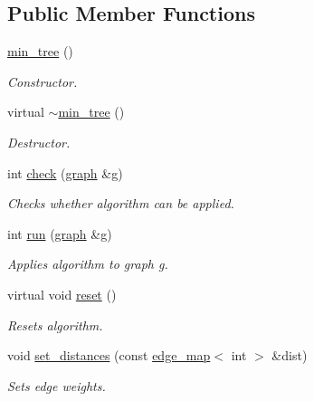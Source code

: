\subsection*{Public Member Functions}
\begin{DoxyCompactItemize}
\item 
\mbox{\label{classmin__tree_a4be3e62d3ba8237883dcc04419ecd483}} 
\mbox{\hyperlink{classmin__tree_a4be3e62d3ba8237883dcc04419ecd483}{min\+\_\+tree}} ()
\begin{DoxyCompactList}\small\item\em Constructor. \end{DoxyCompactList}\item 
\mbox{\label{classmin__tree_a0df992f77a8656121777aa2c0380a67a}} 
virtual \mbox{\hyperlink{classmin__tree_a0df992f77a8656121777aa2c0380a67a}{$\sim$min\+\_\+tree}} ()
\begin{DoxyCompactList}\small\item\em Destructor. \end{DoxyCompactList}\item 
int \mbox{\hyperlink{classmin__tree_ad87b1bfbc687ad943c07538fa0c3d270}{check}} (\mbox{\hyperlink{classgraph}{graph}} \&g)
\begin{DoxyCompactList}\small\item\em Checks whether algorithm can be applied. \end{DoxyCompactList}\item 
int \mbox{\hyperlink{classmin__tree_ac025e8dad0db7a6a1e0e7b476b547802}{run}} (\mbox{\hyperlink{classgraph}{graph}} \&g)
\begin{DoxyCompactList}\small\item\em Applies algorithm to graph g. \end{DoxyCompactList}\item 
virtual void \mbox{\hyperlink{classmin__tree_a0edbe612424dc5f4de4701b8fd0df931}{reset}} ()
\begin{DoxyCompactList}\small\item\em Resets algorithm. \end{DoxyCompactList}\item 
void \mbox{\hyperlink{classmin__tree_a0f3eb1714b7859576037cf4b991b16cb}{set\+\_\+distances}} (const \mbox{\hyperlink{classedge__map}{edge\+\_\+map}}$<$ int $>$ \&dist)
\begin{DoxyCompactList}\small\item\em Sets edge weights. \end{DoxyCompactList}\item 

\end{DoxyCompactItemize}
